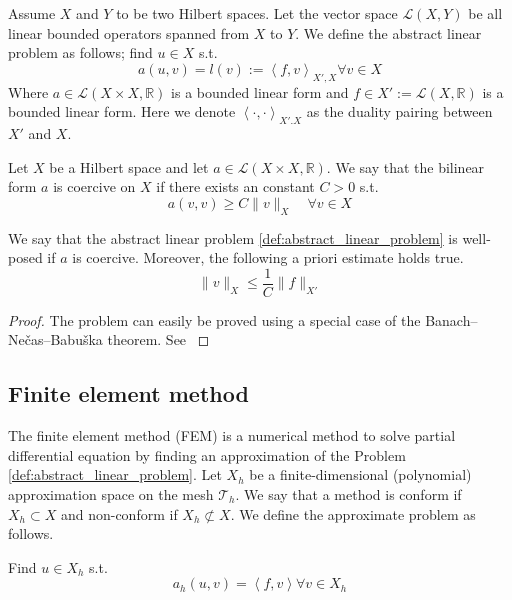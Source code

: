 \begin{problem}
    \label{def:abstract_linear_problem}
    Assume $X$ and $Y$  to be two Hilbert spaces. Let the vector space $\mathcal{L}( X,Y)  $ be all linear bounded operators spanned from $X$ to $Y$. We define the abstract linear problem as follows; find $u \in X$ s.t. \[
    a( u,v)  = l(v ) := \left<f,v \right>_{X' , X}  \forall v \in X
    \]
    Where $a \in  \mathcal{L} ( X \times X,\mathbb{R} ) $ is a bounded linear form and $f \in X':= \mathcal{L} ( X,\mathbb{R} )  $ is a bounded linear form. Here we denote $\left<\cdot ,\cdot  \right>_{X' .X} $ as the duality pairing between $X' $
    and $X $.

\end{problem}


\begin{definition}[Coercivity]
    \label{def:coercivity}
    Let $X$ be a Hilbert space and let $a \in  \mathcal{L} ( X \times  X,\mathbb{R} )  $. We say that the bilinear form $a$ is coercive on $X$ if there exists an constant $C > 0 $ s.t. \[
     a( v,v) \ge  C \| v \|_{ X }^{  } \quad  \forall v \in  X
    \]
\end{definition}


\begin{lemma}
    \label{def:lax-milgram}
    We say that the abstract linear problem \ref{def:abstract_linear_problem} is well-posed if $a$ is coercive. Moreover, the following a priori estimate holds true.\[
    \| v \|_{ X }^{  } \le \frac{1}{C} \| f \|_{ X'  }^{  }
    \]
\end{lemma}
\begin{proof}
    The problem can easily be proved using a special case of the Banach–Nečas–Babuška theorem. See \cite[Lemma 1.4]{pietro2012}
\end{proof}



\subsection{Finite element method}%
\label{sub:finite_element_method}


The finite element method (FEM) is a numerical method to solve partial differential equation by finding an approximation of the Problem \ref{def:abstract_linear_problem}.  Let $X_{h}$ be a finite-dimensional (polynomial) approximation space on the mesh
$\mathcal{T} _{h}$. We say that a method is conform if $X_{h}\subset X $ and non-conform if $X _{h} \not\subset X$. We define the approximate problem as follows.
\begin{problem}
    \label{def:approx_problem}
    Find  $u \in X_{h}$ s.t. \[
    a_{h}(u,v ) = \left<f,v \right>   \forall v \in X_{h}
    \]
\end{problem}

